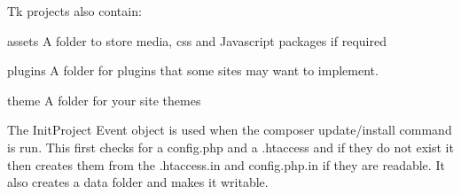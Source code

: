 Tk projects also contain\+:


\begin{DoxyItemize}
\item {\ttfamily assets} A folder to store media, css and Javascript packages if required
\item {\ttfamily plugins} A folder for plugins that some sites may want to implement.
\item {\ttfamily theme} A folder for your site themes
\end{DoxyItemize}

The Init\+Project Event object is used when the composer update/install command is run. This first checks for a config.\+php and a .htaccess and if they do not exist it then creates them from the .htaccess.\+in and config.\+php.\+in if they are readable. It also creates a data folder and makes it writable. 